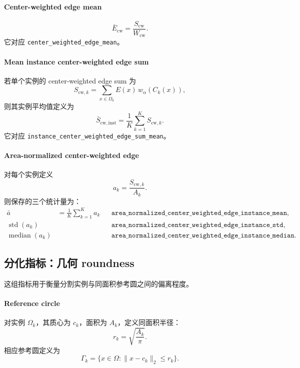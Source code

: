 \documentclass[11pt]{article}
\newcommand{\1}{\mathbf{1}}
\newcommand{\std}{\operatorname{std}}
\newcommand{\edgefield}{E}
\begin{document}
\paragraph{Center-weighted edge mean}
\begin{equation}
\bar{E}_{\mathrm{cw}} = \frac{S_{\mathrm{cw}}}{W_{\mathrm{cw}}}.
\end{equation}
它对应 \texttt{center\_weighted\_edge\_mean}。

\paragraph{Mean instance center-weighted edge sum}
若单个实例的 center-weighted edge sum 为
\begin{equation}
S_{\mathrm{cw},k}=\sum_{x\in\Omega_k} \edgefield(x)\,w_{\alpha}(C_k(x)),
\end{equation}
则其实例平均值定义为
\begin{equation}
\bar{S}_{\mathrm{cw,inst}} = \frac{1}{K}\sum_{k=1}^{K} S_{\mathrm{cw},k}.
\end{equation}
它对应 \texttt{instance\_center\_weighted\_edge\_sum\_mean}。

\paragraph{Area-normalized center-weighted edge}
对每个实例定义
\begin{equation}
a_k = \frac{S_{\mathrm{cw},k}}{A_k}.
\end{equation}
则保存的三个统计量为：
\begin{align}
\bar{a} &= \frac{1}{K}\sum_{k=1}^{K} a_k && \texttt{area\_normalized\_center\_weighted\_edge\_instance\_mean},\\
\std(a_k) &&& \texttt{area\_normalized\_center\_weighted\_edge\_instance\_std},\\
\operatorname{median}(a_k) &&& \texttt{area\_normalized\_center\_weighted\_edge\_instance\_median}.
\end{align}

\subsection{分化指标：几何 roundness}
这组指标用于衡量分割实例与同面积参考圆之间的偏离程度。

\paragraph{Reference circle}
对实例 $\Omega_k$，其质心为 $c_k$，面积为 $A_k$，定义同面积半径：
\begin{equation}
r_k = \sqrt{\frac{A_k}{\pi}}.
\end{equation}
相应参考圆定义为
\begin{equation}
\Gamma_k = \{x\in\Omega : \|x-c_k\|_2 \le r_k\}.
\end{equation}
\end{document}
